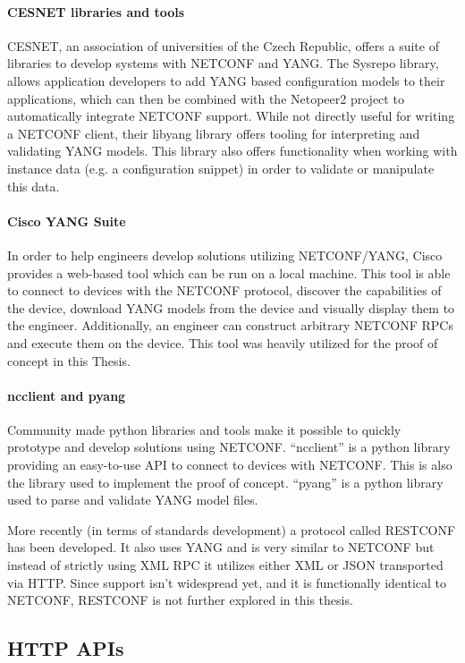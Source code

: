 \paragraph{CESNET libraries and tools} CESNET, an association of universities of the Czech Republic,
offers a suite of libraries to develop systems with NETCONF and YANG.
The Sysrepo library, allows application developers to add YANG based configuration models to their
applications, which can then be combined with the Netopeer2 project to automatically integrate NETCONF
support. While not directly useful for writing a NETCONF client, their libyang library offers
tooling for interpreting and validating YANG models. This library also offers functionality when
working with instance data (e.g. a configuration snippet) in order to validate or manipulate this data.

\paragraph{Cisco YANG Suite} In order to help engineers develop solutions
utilizing NETCONF/YANG, Cisco provides a web-based tool which can be run
on a local machine. This tool is able to connect to devices with the
NETCONF protocol, discover the capabilities of the device, download YANG
models from the device and visually display them to the engineer.
Additionally, an engineer can construct arbitrary NETCONF RPCs and
execute them on the device. This tool was heavily utilized for the
proof of concept in this Thesis.

\paragraph{ncclient and pyang} Community made python libraries and tools
make it possible to quickly prototype and develop solutions using NETCONF.
``ncclient'' is a python library providing an easy-to-use API to connect
to devices with NETCONF. This is also the library used to implement the
proof of concept. ``pyang'' is a python library used to parse and
validate YANG model files.  

More recently (in terms of standards development) a protocol called RESTCONF
has been developed. It also uses YANG and is very similar to NETCONF but
instead of strictly using XML RPC it utilizes either XML or JSON transported
via HTTP. Since support isn't widespread yet, and it is functionally identical
to NETCONF, RESTCONF is not further explored in this thesis.

\subsection{HTTP APIs}

